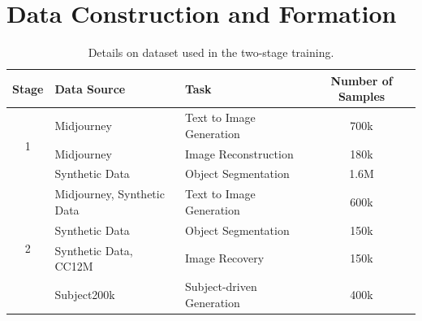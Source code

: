\begin{table}[t]
    \centering
    \caption{Zero-shot FID scores on the MS-COCO benchmark. Lower is better.}
    \label{tab:fid_comparison}
\end{table}


\section{Data Construction and Formation}
\label{sec:data_const}

\begin{table}[!htbp]
\centering
\caption{Details on dataset used in the two-stage training.}
\label{tab:dataset1}
\small %
\begin{tabular}{@{}cllc@{}}
\toprule
\textbf{Stage} & \textbf{Data Source} & \textbf{Task} & \textbf{Number of Samples} \\ 
\midrule
\multirow{3}{*}{1} 
    & Midjourney\citep{midjourney-niji-1m-llavanext} & Text to Image Generation & 700k \\ 
    & Midjourney\citep{midjourney-niji-1m-llavanext} & Image Reconstruction & 180k \\ 
    & Synthetic Data & Object Segmentation & 1.6M \\ 
\midrule
\multirow{4}{*}{2} 
    & Midjourney\citep{midjourney-niji-1m-llavanext}, Synthetic Data & Text to Image Generation & 600k \\ 
    & Synthetic Data & Object Segmentation & 150k \\ 
    & Synthetic Data, CC12M\citep{changpinyo2021cc12m} & Image Recovery & 150k \\ 
    & Subject200k\citep{OminiControl} & Subject-driven Generation & 400k \\ 
\bottomrule
\end{tabular}
\end{table}


